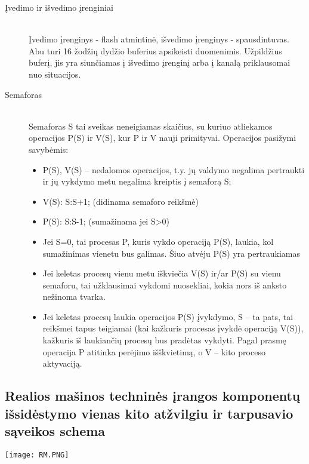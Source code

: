\begin{description}
  \item[Įvedimo ir išvedimo įrenginiai] \leavevmode \\
Įvedimo įrenginys - flash atmintinė, išvedimo įrenginys - spausdintuvas. Abu turi 16 žodžių dydžio buferius apsikeisti duomenimis. Užpildžius buferį, jis yra siunčiamas
į išvedimo įrenginį arba į kanalą priklausomai nuo situacijos.

  \item[Semaforas] \leavevmode \\
Semaforas S tai sveikas neneigiamas skaičius, su kuriuo atliekamos operacijos P(S) ir V(S), kur P ir V nauji primityvai. Operacijos pasižymi savybėmis:
\begin{itemize}
\item P(S), V(S) – nedalomos operacijos, t.y. jų valdymo negalima pertraukti ir jų vykdymo metu negalima kreiptis į semaforą S;
\item V(S):     S:S+1; (didinama semaforo reikšmė)
\item P(S):      S:S-1; (sumažinama jei S>0)
\item Jei S=0, tai procesas P, kuris vykdo operaciją P(S), laukia, kol sumažinimas vienetu bus galimas. Šiuo atvėju P(S) yra pertraukiamas
\item Jei keletas procesų vienu metu iškviečia V(S) ir/ar P(S) su vienu semaforu, tai užklausimai vykdomi nuosekliai, kokia nors iš anksto nežinoma tvarka.
\item Jei keletas procesų laukia operacijos P(S) įvykdymo, S – ta pats, tai reikšmei tapus teigiamai (kai kažkuris procesas įvykdė operaciją V(S)), kažkuris iš laukiančių procesų bus pradėtas vykdyti.
Pagal prasmę operacija P atitinka perėjimo išškvietimą, o V – kito proceso aktyvaciją.
\end{itemize}

\end{description}

\subsection{Realios mašinos techninės įrangos komponentų išsidėstymo vienas kito atžvilgiu ir tarpusavio sąveikos schema}
\texttt{[image: RM.PNG]}

\newpage
